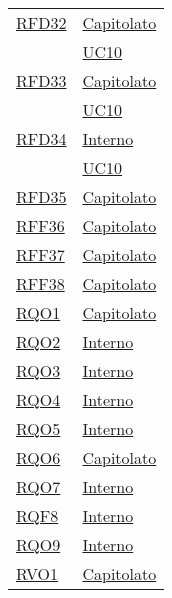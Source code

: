 \begin{longtable}{|>{\centering}m{5cm}|m{5cm}<{\centering}|}
\hyperlink{RFD32}{RFD32} & \hyperlink{Capitolato}{Capitolato}\\
& \hyperref[UC10]{UC10}\\ \hline

\hyperlink{RFD33}{RFD33} & \hyperlink{Capitolato}{Capitolato}\\
& \hyperref[UC10]{UC10}\\ \hline

\hyperlink{RFD34}{RFD34} & \hyperlink{Interno}{Interno}\\
& \hyperref[UC10]{UC10}\\ \hline

\hyperlink{RFD35}{RFD35} & \hyperlink{Capitolato}{Capitolato}\\ \hline

\hyperlink{RFF36}{RFF36} & \hyperlink{Capitolato}{Capitolato}\\ \hline

\hyperlink{RFF37}{RFF37} & \hyperlink{Capitolato}{Capitolato}\\ \hline

\hyperlink{RFF38}{RFF38} & \hyperlink{Capitolato}{Capitolato}\\ \hline

\hyperlink{RQO1}{RQO1} & \hyperlink{Capitolato}{Capitolato}\\ \hline

\hyperlink{RQO2}{RQO2} & \hyperlink{Interno}{Interno}\\ \hline

\hyperlink{RQO3}{RQO3} & \hyperlink{Interno}{Interno}\\ \hline

\hyperlink{RQO4}{RQO4} & \hyperlink{Interno}{Interno}\\ \hline

\hyperlink{RQO5}{RQO5} & \hyperlink{Interno}{Interno}\\ \hline

\hyperlink{RQO6}{RQO6} & \hyperlink{Capitolato}{Capitolato}\\ \hline

\hyperlink{RQO7}{RQO7} & \hyperlink{Interno}{Interno}\\ \hline

\hyperlink{RQF8}{RQF8} & \hyperlink{Interno}{Interno}\\ \hline

\hyperlink{RQO9}{RQO9} & \hyperlink{Interno}{Interno}\\ \hline

\hyperlink{RVO1}{RVO1} & \hyperlink{Capitolato}{Capitolato}\\ \hline


\end{longtable}
